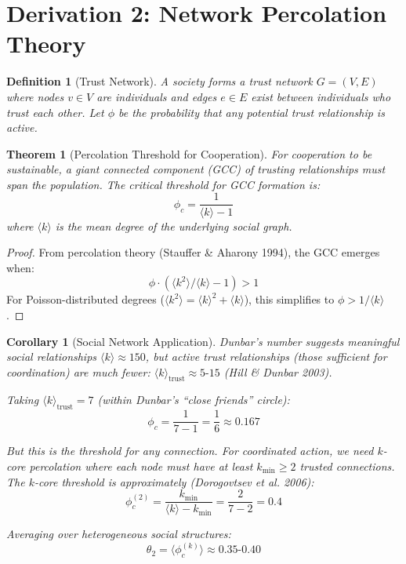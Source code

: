 \documentclass[11pt]{article}
\newtheorem{theorem}{Theorem}
\newtheorem{corollary}{Corollary}
\newtheorem{definition}{Definition}
\begin{document}
\section{Derivation 2: Network Percolation Theory}

\begin{definition}[Trust Network]
A society forms a trust network $G = (V, E)$ where nodes $v \in V$ are individuals and edges $e \in E$ exist between individuals who trust each other. Let $\phi$ be the probability that any potential trust relationship is active.
\end{definition}

\begin{theorem}[Percolation Threshold for Cooperation]
For cooperation to be sustainable, a giant connected component (GCC) of trusting relationships must span the population. The critical threshold for GCC formation is:
\begin{equation}
\phi_c = \frac{1}{\langle k \rangle - 1}
\end{equation}
where $\langle k \rangle$ is the mean degree of the underlying social graph.
\end{theorem}

\begin{proof}
From percolation theory (Stauffer \& Aharony 1994), the GCC emerges when:
\begin{equation}
\phi \cdot (\langle k^2 \rangle / \langle k \rangle - 1) > 1
\end{equation}
For Poisson-distributed degrees ($\langle k^2 \rangle = \langle k \rangle^2 + \langle k \rangle$), this simplifies to $\phi > 1/\langle k \rangle$.
\end{proof}

\begin{corollary}[Social Network Application]
Dunbar's number suggests meaningful social relationships $\langle k \rangle \approx 150$, but \emph{active trust relationships} (those sufficient for coordination) are much fewer: $\langle k \rangle_{\text{trust}} \approx 5\text{-}15$ (Hill \& Dunbar 2003).

Taking $\langle k \rangle_{\text{trust}} = 7$ (within Dunbar's ``close friends'' circle):
\begin{equation}
\phi_c = \frac{1}{7-1} = \frac{1}{6} \approx 0.167
\end{equation}

But this is the threshold for \emph{any} connection. For \emph{coordinated action}, we need $k$-core percolation where each node must have at least $k_{\min} \geq 2$ trusted connections. The $k$-core threshold is approximately (Dorogovtsev et al. 2006):
\begin{equation}
\phi_c^{(2)} = \frac{k_{\min}}{\langle k \rangle - k_{\min}} = \frac{2}{7-2} = 0.4
\end{equation}

Averaging over heterogeneous social structures:
\begin{equation}
\theta_2 = \langle \phi_c^{(k)} \rangle \approx \mathbf{0.35\text{-}0.40}
\end{equation}
\end{corollary}
\end{document}
